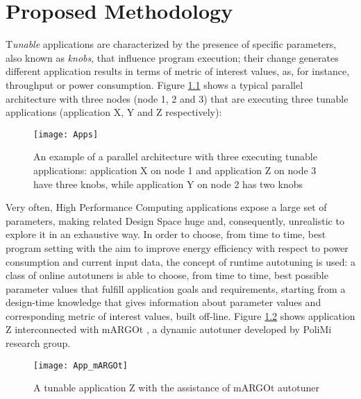 \chapter{Proposed Methodology}\label{methodology}

\lettrine{T}{}\textit{unable} applications are characterized by the presence of specific parameters, also known as \textit{knobs}, that influence program execution; their change generates different application results in terms of metric of interest values, as, for instance, throughput or power consumption. Figure \ref{fig::appDef} shows a typical parallel architecture with three nodes (node 1, 2 and 3) that are executing three tunable applications (application X, Y and Z respectively):

\begin{figure}[H]

    \centering
    \texttt{[image: Apps]}
    \caption[Parallel architecture with tunable applications example]{An example of a parallel architecture with three executing tunable applications: application X on node 1 and application Z on node 3 have three knobs, while application Y on node 2 has two knobs}
    \label{fig::appDef}
    
\end{figure}

Very often, High Performance Computing applications expose a large set of parameters, making related Design Space huge and, consequently, unrealistic to explore it in an exhaustive way. In order to choose, from time to time, best program setting with the aim to improve energy efficiency with respect to power consumption and current input data, the concept of runtime autotuning is used: a class of online autotuners is able to choose, from time to time, best possible parameter values that fulfill application goals and requirements, starting from a design-time knowledge that gives information about parameter values and corresponding metric of interest values, built off-line. Figure \ref{fig::appAut} shows application Z interconnected with mARGOt \cite{gadioli2015application}, a dynamic autotuner developed by PoliMi research group.

\begin{figure}[H]

    \centering
    \texttt{[image: App\_mARGOt]}
    \caption{A tunable application Z with the assistance of mARGOt autotuner}
    \label{fig::appAut}
    
\end{figure}

